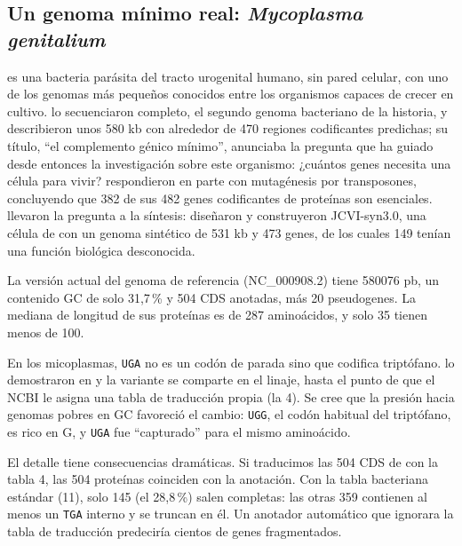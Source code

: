 \subsection{Un genoma mínimo real: \emph{Mycoplasma genitalium}}

 es una bacteria parásita del tracto urogenital humano, sin pared celular, con uno de los genomas más pequeños conocidos entre los organismos capaces de crecer en cultivo. \textcite{c01-fraser1995} lo secuenciaron completo, el segundo genoma bacteriano de la historia, y describieron unos 580 kb con alrededor de 470 regiones codificantes predichas; su título, ``el complemento génico mínimo'', anunciaba la pregunta que ha guiado desde entonces la investigación sobre este organismo: ¿cuántos genes necesita una célula para vivir? \textcite{c01-glass2006} respondieron en parte con mutagénesis por transposones, concluyendo que 382 de sus 482 genes codificantes de proteínas son esenciales. \textcite{c01-hutchison2016} llevaron la pregunta a la síntesis: diseñaron y construyeron JCVI-syn3.0, una célula de  con un genoma sintético de 531 kb y 473 genes, de los cuales 149 tenían una función biológica desconocida.

La versión actual del genoma de referencia (NC\_000908.2) tiene \num{580076} pb, un contenido GC de solo 31,7\,\% y 504 CDS anotadas, más 20 pseudogenes. La mediana de longitud de sus proteínas es de 287 aminoácidos, y solo 35 tienen menos de 100.

\begin{historia}
En los micoplasmas, \texttt{UGA} no es un codón de parada sino que codifica triptófano. \textcite{c01-yamao1985} lo demostraron en  y la variante se comparte en el linaje, hasta el punto de que el NCBI le asigna una tabla de traducción propia (la 4). Se cree que la presión hacia genomas pobres en GC favoreció el cambio: \texttt{UGG}, el codón habitual del triptófano, es rico en G, y \texttt{UGA} fue ``capturado'' para el mismo aminoácido.
\end{historia}

El detalle tiene consecuencias dramáticas. Si traducimos las 504 CDS de  con la tabla 4, las 504 proteínas coinciden con la anotación. Con la tabla bacteriana estándar (11), solo 145 (el 28,8\,\%) salen completas: las otras 359 contienen al menos un \texttt{TGA} interno y se truncan en él. Un anotador automático que ignorara la tabla de traducción predeciría cientos de genes fragmentados.

